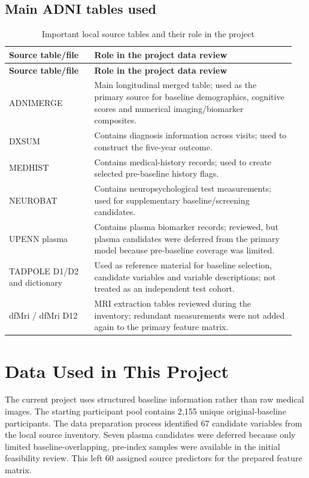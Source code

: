 \documentclass[11pt,a4paper]{article}
\begin{document}
\subsection{Main ADNI tables used}
\begingroup\small\renewcommand{\arraystretch}{1.16}
\begin{longtable}{@{}>{\raggedright\arraybackslash}p{0.29\linewidth}>{\raggedright\arraybackslash}p{0.66\linewidth}@{}}
\caption{Important local source tables and their role in the project}\\
\toprule \textbf{Source table/file} & \textbf{Role in the project data review}\\\midrule\endfirsthead
\toprule \textbf{Source table/file} & \textbf{Role in the project data review}\\\midrule\endhead
\midrule\endfoot\bottomrule\endlastfoot
ADNIMERGE & Main longitudinal merged table; used as the primary source for baseline demographics, cognitive scores and numerical imaging/biomarker composites.\\
DXSUM & Contains diagnosis information across visits; used to construct the five-year outcome.\\
MEDHIST & Contains medical-history records; used to create selected pre-baseline history flags.\\
NEUROBAT & Contains neuropsychological test measurements; used for supplementary baseline/screening candidates.\\
UPENN plasma & Contains plasma biomarker records; reviewed, but plasma candidates were deferred from the primary model because pre-baseline coverage was limited.\\
TADPOLE D1/D2 and dictionary & Used as reference material for baseline selection, candidate variables and variable descriptions; not treated as an independent test cohort.\\
dfMri / dfMri D12 & MRI extraction tables reviewed during the inventory; redundant measurements were not added again to the primary feature matrix.\\
\end{longtable}\endgroup
\section{Data Used in This Project}
The current project uses structured baseline information rather than raw medical images. The starting participant pool contains 2,155 unique original-baseline participants. The data preparation process identified 67 candidate variables from the local source inventory. Seven plasma candidates were deferred because only limited baseline-overlapping, pre-index samples were available in the initial feasibility review. This left 60 assigned source predictors for the prepared feature matrix.
\end{document}
